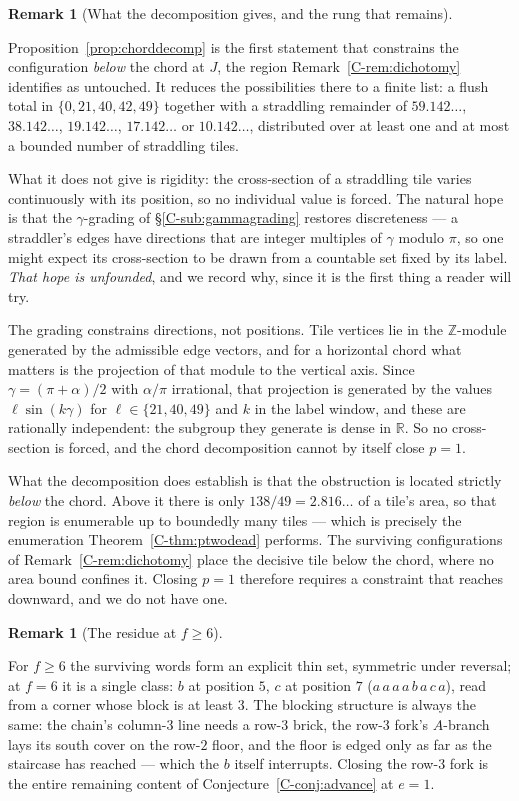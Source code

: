 \documentclass[11pt,reqno]{amsart}
\theoremstyle{plain}
\theoremstyle{definition}
\newtheorem{remark}[theorem]{Remark}
\begin{document}
\begin{remark}[What the decomposition gives, and the rung that remains]\label{O-chordscope}

Proposition~\ref{prop:chorddecomp} is the first statement that constrains the configuration
\emph{below} the chord at $J$, the region Remark~\ref{C-rem:dichotomy} identifies as untouched. It
reduces the possibilities there to a finite list: a flush total in $\{0,21,40,42,49\}$ together with a
straddling remainder of $59.142\ldots$, $38.142\ldots$, $19.142\ldots$, $17.142\ldots$ or
$10.142\ldots$, distributed over at least one and at most a bounded number of straddling tiles.

What it does not give is rigidity: the cross-section of a straddling tile varies continuously with its
position, so no individual value is forced. The natural hope is that the $\gamma$-grading of
\S\ref{C-sub:gammagrading} restores discreteness --- a straddler's edges have directions that are
integer multiples of $\gamma$ modulo $\pi$, so one might expect its cross-section to be drawn from a
countable set fixed by its label. \emph{That hope is unfounded}, and we record why, since it is the
first thing a reader will try.

The grading constrains directions, not positions. Tile vertices lie in the $\mathbb Z$-module
generated by the admissible edge vectors, and for a horizontal chord what matters is the projection
of that module to the vertical axis. Since $\gamma=(\pi+\alpha)/2$ with $\alpha/\pi$ irrational, that
projection is generated by the values $\ell\sin(k\gamma)$ for $\ell\in\{21,40,49\}$ and $k$ in the label
window, and these are rationally independent: the subgroup they generate is dense in $\mathbb R$.
So no cross-section is forced, and the chord decomposition cannot by itself close $p=1$.

What the decomposition does establish is that the obstruction is located strictly \emph{below} the
chord. Above it there is only $138/49=2.816\ldots$ of a tile's area, so that region is enumerable up
to boundedly many tiles --- which is precisely the enumeration Theorem~\ref{C-thm:ptwodead} performs.
The surviving configurations of Remark~\ref{C-rem:dichotomy} place the decisive tile below the chord,
where no area bound confines it. Closing $p=1$ therefore requires a constraint that reaches downward,
and we do not have one.
\end{remark}

\begin{remark}[The residue at $f\ge6$]\label{O-f6residue}

For $f\ge6$ the surviving words form an explicit thin set, symmetric under reversal; at $f=6$ it
is a single class: $b$ at position $5$, $c$ at position $7$ ($a\,a\,a\,a\,b\,a\,c\,a$), read from
a corner whose block is at least $3$. The blocking structure is always the same: the chain's
column-$3$ line needs a row-$3$ brick, the row-$3$ fork's $A$-branch lays its south cover on the
row-$2$ floor, and the floor is edged only as far as the staircase has reached --- which the $b$
itself interrupts. Closing the row-$3$ fork is the entire remaining content of
Conjecture~\ref{C-conj:advance} at $e=1$.
\end{remark}
\end{document}
